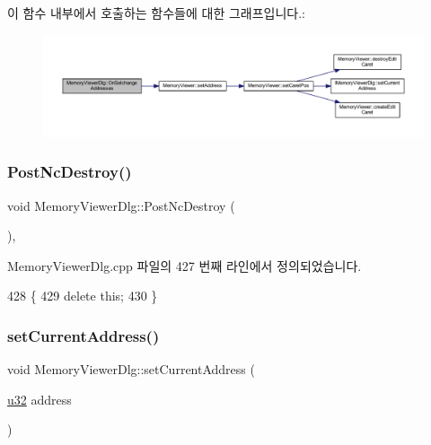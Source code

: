 이 함수 내부에서 호출하는 함수들에 대한 그래프입니다.\+:
\nopagebreak
\begin{figure}[H]
\begin{center}
\leavevmode
\includegraphics[width=350pt]{class_memory_viewer_dlg_ab7624247967998f1973da99a035a28e3_cgraph}
\end{center}
\end{figure}
\mbox{\label{class_memory_viewer_dlg_a3dd16d8770e7b5d3e174c9630ca4ecb8}} 
\subsubsection{\texorpdfstring{Post\+Nc\+Destroy()}{PostNcDestroy()}}
{\footnotesize\ttfamily void Memory\+Viewer\+Dlg\+::\+Post\+Nc\+Destroy (\begin{DoxyParamCaption}{ }\end{DoxyParamCaption})\hspace{0.3cm}{\ttfamily [protected]}, {\ttfamily [virtual]}}



Memory\+Viewer\+Dlg.\+cpp 파일의 427 번째 라인에서 정의되었습니다.


\begin{DoxyCode}
428 \{
429   \textcolor{keyword}{delete} \textcolor{keyword}{this};
430 \}
\end{DoxyCode}
\mbox{\label{class_memory_viewer_dlg_ac027e2a8dc226a7053068680050abd1f}} 
\subsubsection{\texorpdfstring{set\+Current\+Address()}{setCurrentAddress()}}
{\footnotesize\ttfamily void Memory\+Viewer\+Dlg\+::set\+Current\+Address (\begin{DoxyParamCaption}\item[{\mbox{\hyperlink{_system_8h_a10e94b422ef0c20dcdec20d31a1f5049}{u32}}}]{address }\end{DoxyParamCaption})\hspace{0.3cm}{\ttfamily [virtual]}}



